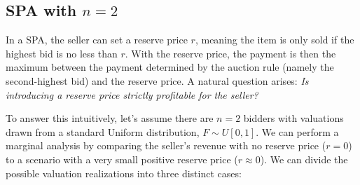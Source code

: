 \subsection{SPA with $n = 2$}

In a SPA, the seller can set a reserve price $r$, meaning the item is only sold if the highest bid is no less than $r$. With the reserve price,  the payment is then the maximum between the payment determined by the auction rule (namely the second-highest bid) and the reserve price. A natural question arises: \textit{Is introducing a reserve price strictly profitable for the seller?}

To answer this intuitively, let's assume there are $n=2$ bidders with valuations drawn from a standard Uniform distribution, $F \sim U[0,1]$. We can perform a marginal analysis by comparing the seller's revenue with no reserve price ($r=0$) to a scenario with a very small positive reserve price ($r \approx 0$). We can divide the possible valuation realizations into three distinct cases:

\begin{center}
\end{center}

